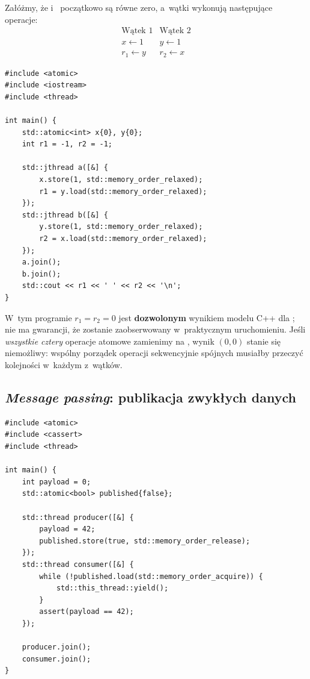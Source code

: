 Załóżmy, że  i~ początkowo są równe zero, a~wątki
wykonują następujące operacje:
\[
\begin{array}{c|c}
\text{Wątek 1} & \text{Wątek 2}\\ \hline
x\gets 1 & y\gets 1\\
r_1\gets y & r_2\gets x
\end{array}
\]

\begin{lstlisting}[caption={Store buffering: kompletna, wolna od wyścigu danych próba (C++20).}]
#include <atomic>
#include <iostream>
#include <thread>

int main() {
    std::atomic<int> x{0}, y{0};
    int r1 = -1, r2 = -1;

    std::jthread a([&] {
        x.store(1, std::memory_order_relaxed);
        r1 = y.load(std::memory_order_relaxed);
    });
    std::jthread b([&] {
        y.store(1, std::memory_order_relaxed);
        r2 = x.load(std::memory_order_relaxed);
    });
    a.join();
    b.join();
    std::cout << r1 << ' ' << r2 << '\n';
}
\end{lstlisting}

W~tym programie \(r_1=r_2=0\) jest \textbf{dozwolonym} wynikiem
modelu C++ dla ; nie ma gwarancji, że zostanie
zaobserwowany w~praktycznym uruchomieniu. Jeśli \emph{wszystkie cztery}
operacje atomowe zamienimy na , wynik
\((0,0)\) stanie się niemożliwy: wspólny porządek operacji
sekwencyjnie spójnych musiałby przeczyć kolejności w~każdym z~wątków.


\subsection{\emph{Message passing}: publikacja zwykłych danych}

\begin{lstlisting}[caption={Publikacja danych przy użyciu release/acquire (C++11).}]
#include <atomic>
#include <cassert>
#include <thread>

int main() {
    int payload = 0;
    std::atomic<bool> published{false};

    std::thread producer([&] {
        payload = 42;
        published.store(true, std::memory_order_release);
    });
    std::thread consumer([&] {
        while (!published.load(std::memory_order_acquire)) {
            std::this_thread::yield();
        }
        assert(payload == 42);
    });

    producer.join();
    consumer.join();
}
\end{lstlisting}

